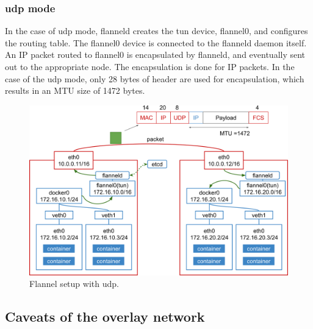 \FloatBarrier

\subsubsection{udp mode}

In the case of udp mode, flanneld creates the tun device, flannel0, and configures the routing table.
The flannel0 device is connected to the flanneld daemon itself.
An IP packet routed to flannel0 is encapsulated by flanneld, and eventually sent out 
to the appropriate node. 
The encapsulation is done for IP packets.
In the case of the udp mode, only 28 bytes of header are used for encapsulation, which results in an MTU size of 1472 bytes.

\begin{figure}[h]
  \centering
  \includegraphics[width=0.95\columnwidth]{Figs/flannel-udp}

  \par\bigskip
  \centering
  \begin{minipage}{0.9\columnwidth}
    \caption[Flannel setup with udp]{
      Flannel setup with udp.
    }
    \label{Figs/flannel-udp}
  \end{minipage}
\end{figure}

\FloatBarrier

\subsection{Caveats of the overlay network}

